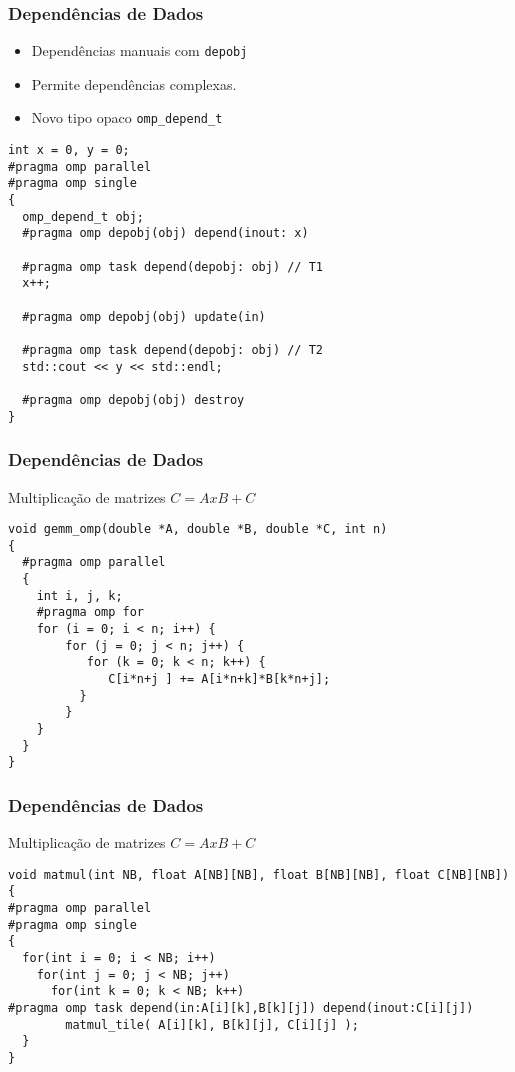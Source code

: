 \begin{frame}[fragile]
  \frametitle{Dependências de Dados}
\begin{itemize}
  \item Dependências manuais com \texttt{depobj}
  \item Permite dependências complexas.
  \item Novo tipo opaco \texttt{omp_depend_t}
\end{itemize}
%
\begin{minipage}{0.95\textwidth}  
\begin{verbatim}  
int x = 0, y = 0;
#pragma omp parallel
#pragma omp single
{
  omp_depend_t obj;
  #pragma omp depobj(obj) depend(inout: x)

  #pragma omp task depend(depobj: obj) // T1
  x++;

  #pragma omp depobj(obj) update(in)

  #pragma omp task depend(depobj: obj) // T2
  std::cout << y << std::endl;

  #pragma omp depobj(obj) destroy
}
\end{verbatim}
\end{minipage}
\end{frame}
\begin{frame}[fragile]
  \frametitle{Dependências de Dados}
Multiplicação de matrizes $C = A x B + C$
%
\begin{minipage}{0.95\textwidth}  
\begin{verbatim}  
void gemm_omp(double *A, double *B, double *C, int n) 
{   
  #pragma omp parallel
  {
    int i, j, k;
    #pragma omp for
    for (i = 0; i < n; i++) { 
        for (j = 0; j < n; j++) {
           for (k = 0; k < n; k++) {
              C[i*n+j ] += A[i*n+k]*B[k*n+j];
          } 
        }
    }
  }
}
\end{verbatim}
\end{minipage}
\end{frame}
\begin{frame}[fragile]
  \frametitle{Dependências de Dados}
Multiplicação de matrizes $C = A x B + C$
%
\begin{minipage}{0.95\textwidth}  
\begin{verbatim}  
void matmul(int NB, float A[NB][NB], float B[NB][NB], float C[NB][NB])
{ 
#pragma omp parallel
#pragma omp single
{
  for(int i = 0; i < NB; i++)
    for(int j = 0; j < NB; j++)
      for(int k = 0; k < NB; k++)
#pragma omp task depend(in:A[i][k],B[k][j]) depend(inout:C[i][j])
        matmul_tile( A[i][k], B[k][j], C[i][j] );
  }
}
\end{verbatim}
\end{minipage}
\end{frame}
